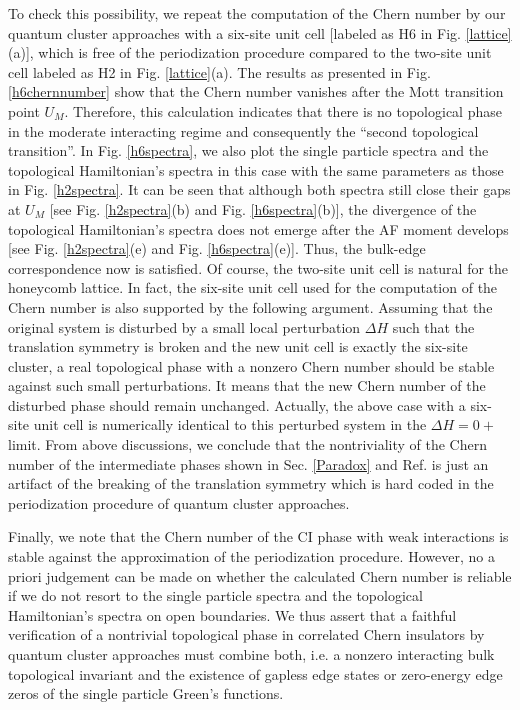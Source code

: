 \documentclass[12pt]{iopart}
\begin{document}
\par To check this possibility, we repeat the computation of the Chern number by our quantum cluster approaches with a six-site unit cell [labeled as H6 in Fig. \ref{lattice}(a)], which is free of the periodization procedure compared to the two-site unit cell labeled as H2 in Fig. \ref{lattice}(a). The results as presented in Fig. \ref{h6chernnumber} show that the Chern number vanishes after the Mott transition point $U_M$. Therefore, this calculation indicates that there is no topological phase in the moderate interacting regime and consequently the ``second topological transition''. In Fig. \ref{h6spectra}, we also plot the single particle spectra and the topological Hamiltonian's spectra in this case with the same parameters as those in Fig. \ref{h2spectra}. It can be seen that although both spectra still close their gaps at $U_M$ [see Fig. \ref{h2spectra}(b) and Fig. \ref{h6spectra}(b)], the divergence of the topological Hamiltonian's spectra does not emerge after the AF moment develops [see Fig. \ref{h2spectra}(e) and Fig. \ref{h6spectra}(e)]. Thus, the bulk-edge correspondence now is satisfied. Of course, the two-site unit cell is natural for the honeycomb lattice. In fact, the six-site unit cell used for the computation of the Chern number is also supported by the following argument.
Assuming that the original system is disturbed by a small local perturbation $\Delta H$ such that the translation symmetry is broken and the new unit cell is exactly the six-site cluster, a real topological phase with a nonzero Chern number should be stable against such small perturbations. It means that the new Chern number of the disturbed phase should remain unchanged. Actually, the above case with a six-site unit cell is numerically identical to this perturbed system in the $\Delta H=0+$ limit. From above discussions, we conclude that the nontriviality of the Chern number of the intermediate phases shown in Sec. \ref{Paradox} and Ref. \cite{WFSM_PRB2016} is just an artifact of the breaking of the translation symmetry which is hard coded in the periodization procedure of quantum cluster approaches.

\par Finally, we note that the Chern number of the CI phase with weak interactions is stable against the approximation of the periodization procedure. However, no a priori judgement can be made on whether the calculated Chern number is reliable if we do not resort to the single particle spectra and the topological Hamiltonian's spectra on open boundaries. We thus assert that a faithful verification of a nontrivial topological phase in correlated Chern insulators by quantum cluster approaches must combine both, i.e. a nonzero interacting bulk topological invariant and the existence of gapless edge states or zero-energy edge zeros of the single particle Green's functions.
\end{document}
